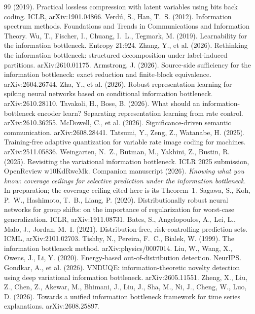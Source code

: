 \documentclass[11pt]{article}
\begin{document}
\begin{thebibliography}{99}
(2019). Practical lossless compression with latent variables using bits back coding. ICLR,
arXiv:1901.04866.
 Verdú, S., Han, T.~S. (2012). Information spectrum
methods. Foundations and Trends in Communications and Information Theory.
 Wu, T., Fischer, I., Chuang, I.~L., Tegmark, M. (2019).
Learnability for the information bottleneck. Entropy 21:924.
 Zhang, Y., et al. (2026). Rethinking the information
bottleneck: structured decomposition under label-induced partitions. arXiv:2610.01175.
 Armstrong, J. (2026). Source-side sufficiency for the
information bottleneck: exact reduction and finite-block equivalence. arXiv:2604.26744.
 Zha, Y., et al. (2026). Robust representation learning for
spiking neural networks based on conditional information bottleneck. arXiv:2610.28110.
 Tavakoli, H., Bose, B. (2026). What should an
information-bottleneck encoder learn? Separating representation learning from rate control.
arXiv:2610.36255.
 McDowell, C., et al. (2026). Significance-driven
semantic communication. arXiv:2608.28441.
 Tatsumi, Y., Zeng, Z., Watanabe, H. (2025).
Training-free adaptive quantization for variable rate image coding for machines. arXiv:2511.05836.
 Weingarten, N.~Z., Butman, M., Yakhini, Z.,
Bustin, R. (2025). Revisiting the variational information bottleneck. ICLR 2025 submission,
OpenReview w10KdRwcMk.
 Companion manuscript (2026). \emph{Knowing what
you know: coverage ceilings for selective prediction under the information bottleneck}. In
preparation; the coverage ceiling cited here is its Theorem~1.
 Sagawa, S., Koh, P.~W., Hashimoto, T.~B., Liang, P.
(2020). Distributionally robust neural networks for group shifts: on the importance of
regularization for worst-case generalization. ICLR, arXiv:1911.08731.
 Bates, S., Angelopoulos, A., Lei, L., Malo, J., Jordan,
M.~I. (2021). Distribution-free, risk-controlling prediction sets. ICML, arXiv:2101.02703.
 Tishby, N., Pereira, F.~C., Bialek, W. (1999). The
information bottleneck method. arXiv:physics/0007014.
 Liu, W., Wang, X., Owens, J., Li, Y. (2020).
Energy-based out-of-distribution detection. NeurIPS.
 Gondkar, A., et al. (2026). VNDUQE: information-theoretic
novelty detection using deep variational information bottleneck. arXiv:2605.11551.
 Zheng, X., Liu, Z., Chen, Z., Akewar, M., Bhimani, J.,
Liu, J., Sha, M., Ni, J., Cheng, W., Luo, D. (2026). Towards a unified information
bottleneck framework for time series explanations. arXiv:2608.25897.
\end{thebibliography}
\end{document}
